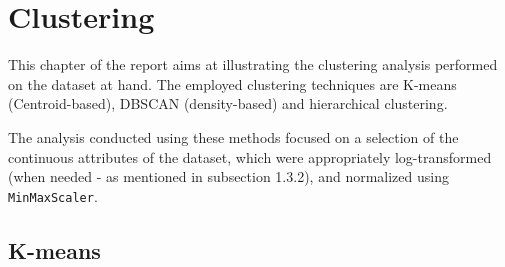 \chapter{Clustering}
\label{ch:capitolo2}

This chapter of the report aims at illustrating the clustering analysis performed on the dataset at hand.
The employed clustering techniques are K-means (Centroid-based), DBSCAN (density-based) and hierarchical clustering.

The analysis conducted using these methods focused on a selection of the continuous attributes of the dataset, which were appropriately log-transformed (when needed - as mentioned in subsection 1.3.2), and normalized using \texttt{MinMaxScaler}. 



\section{K-means}\label{sec:centroid_based}

